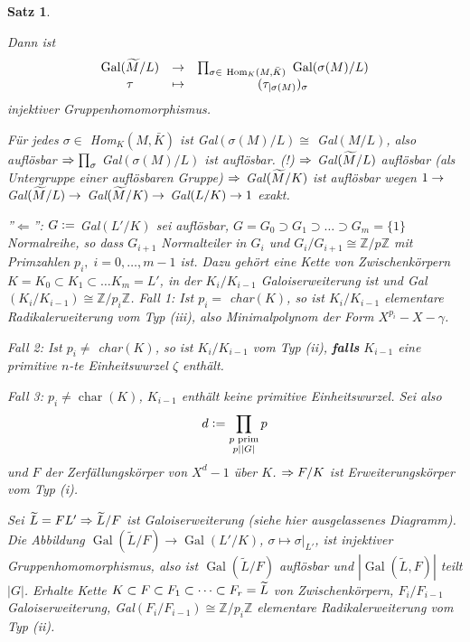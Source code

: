 \documentclass[a4paper,10pt,german]{scrbook}
\theoremstyle{saetze}
\newtheorem{Satz}{Satz}
\theoremstyle{definitionen}
\begin{document}
\begin{Satz}
{\begin{description}
Dann ist \[\begin{array}{ccc} \mbox{Gal}(\widetilde{M}/L) &\rightarrow
&\prod_{\sigma \in \mbox{
\scriptsize Hom}_K(M,\bar K)}\mbox{ Gal}(\sigma(M)/L) \\
\tau &\mapsto &(\tau_{|\sigma(M)})_\sigma \end{array}\] injektiver
Gruppenhomomorphismus.

Für jedes $\sigma \in$ Hom$_K(M,\bar K)$ ist Gal$(\sigma(M)/L)
\cong$ Gal$(M/L)$, also auflösbar $\Rightarrow \prod_\sigma$
Gal$(\sigma(M)/L)$ ist auflösbar. (!) $\Rightarrow$ Gal$(\widetilde{M}/L)$
auflösbar (als Untergruppe einer auflösbaren Gruppe) $\Rightarrow$
Gal$(\widetilde{M}/K)$ ist auflösbar wegen $1 \rightarrow$ Gal$(\widetilde{M}/L) \rightarrow$
Gal$(\widetilde{M}/K) \rightarrow$ Gal$(L/K) \rightarrow 1$ exakt.
\end{description}

''$\Leftarrow$'':
\newline $G \mathrel{\mathop:}=$ Gal$(L'/K)$ sei auflösbar, $G
= G_0 \supset G_1 \supset \dots \supset G_m = \{1\}$ Normalreihe, so
dass $G_{i+1}$ Normalteiler in $G_i$ und $G_i/G_{i+1} \cong
\mathbb{Z}/p\mathbb{Z}$ mit Primzahlen $p_i,\;i=0,\dots,m-1$ ist.
\newline \newline Dazu gehört eine Kette von Zwischenkörpern $K = K_0 \subset K_1
\subset \dots K_m = L'$, in der $K_i/K_{i-1}$ Galoiserweiterung ist
und Gal$(K_i/K_{i-1}) \cong \mathbb{Z}/p_i\mathbb{Z}$.
\newline \newline Fall 1: Ist $p_i =$ char$(K)$, so ist $K_i/K_{i-1}$
elementare Radikalerweiterung vom Typ (iii), also Minimalpolynom der Form $X^{p_i}-X-\gamma$.

Fall 2: Ist $p_i \neq$ char$(K)$, so ist $K_i/K_{i-1}$ vom Typ (ii), \textbf{falls}
$K_{i-1}$ eine primitive $n$-te Einheitswurzel $\zeta$ enthält.

Fall 3: $p_i\ne \operatorname{char}(K)$, $K_{i-1}$ enthält keine primitive Einheitswurzel. Sei also \[d \mathrel{\mathop:}= \prod_{\substack{\text{$p$ prim} \\ p \mid |G|}}p\] und $F$ der Zerfällungskörper von $X^d - 1$ über $K$.
$\Rightarrow F/K$ ist Erweiterungskörper vom Typ (i).

Sei $\widetilde{L} = F L' \Rightarrow \widetilde{L}/F$ ist Galoiserweiterung (siehe
hier ausgelassenes Diagramm). Die Abbildung $\operatorname{Gal}(\tilde L/F) \to \operatorname{Gal}(L' / K)$, $\sigma \mapsto \sigma|_{L'}$, ist injektiver Gruppenhomomorphismus, also ist $\operatorname{Gal}(\tilde L/F)$ auflösbar und $|\operatorname{Gal}(\tilde L,F)|$ teilt $|G|$. Erhalte Kette $K \subset F \subset F_1 \subset \dots \subset
F_r = \widetilde{L}$ von Zwischenkörpern, $F_i/F_{i-1}$ Galoiserweiterung,
Gal$(F_i/F_{i-1}) \cong \mathbb{Z}/p_i\mathbb{Z}$ elementare
Radikalerweiterung vom Typ (ii).}
\end{Satz}

\end{document}
